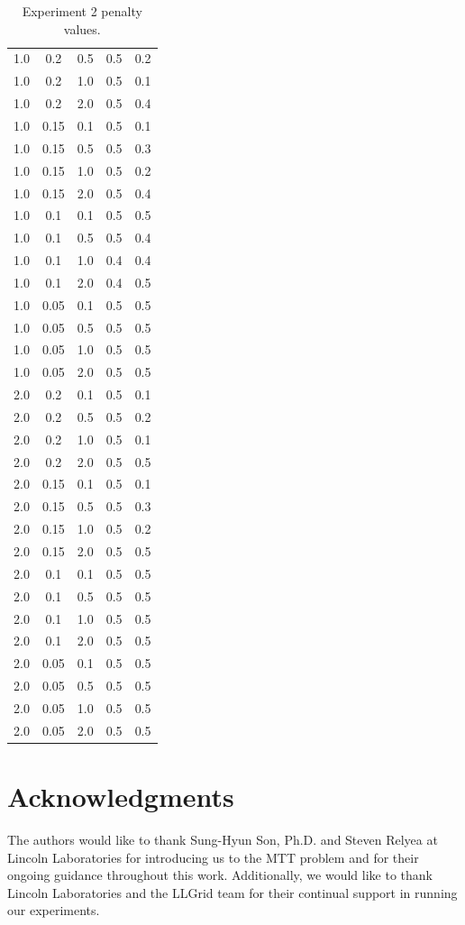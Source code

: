 \documentclass[journal]{IEEEtran}
\begin{document}
\begin{table}[ht]
\begin{tabular}{c|c|c|c|c}
1.0 & 0.2 & 0.5 & 0.5 & 0.2 \\
1.0 & 0.2 & 1.0 & 0.5 & 0.1 \\
1.0 & 0.2 & 2.0 & 0.5 & 0.4 \\
1.0 & 0.15 & 0.1 & 0.5 & 0.1 \\
1.0 & 0.15 & 0.5 & 0.5 & 0.3 \\
1.0 & 0.15 & 1.0 & 0.5 & 0.2 \\
1.0 & 0.15 & 2.0 & 0.5 & 0.4 \\
1.0 & 0.1 & 0.1 & 0.5 & 0.5 \\
1.0 & 0.1 & 0.5 & 0.5 & 0.4 \\
1.0 & 0.1 & 1.0 & 0.4 & 0.4 \\
1.0 & 0.1 & 2.0 & 0.4 & 0.5 \\
1.0 & 0.05 & 0.1 & 0.5 & 0.5 \\
1.0 & 0.05 & 0.5 & 0.5 & 0.5 \\
1.0 & 0.05 & 1.0 & 0.5 & 0.5 \\
1.0 & 0.05 & 2.0 & 0.5 & 0.5 \\
2.0 & 0.2 & 0.1 & 0.5 & 0.1 \\
2.0 & 0.2 & 0.5 & 0.5 & 0.2 \\
2.0 & 0.2 & 1.0 & 0.5 & 0.1 \\
2.0 & 0.2 & 2.0 & 0.5 & 0.5 \\
2.0 & 0.15 & 0.1 & 0.5 & 0.1 \\
2.0 & 0.15 & 0.5 & 0.5 & 0.3 \\
2.0 & 0.15 & 1.0 & 0.5 & 0.2 \\
2.0 & 0.15 & 2.0 & 0.5 & 0.5 \\
2.0 & 0.1 & 0.1 & 0.5 & 0.5 \\
2.0 & 0.1 & 0.5 & 0.5 & 0.5 \\
2.0 & 0.1 & 1.0 & 0.5 & 0.5 \\
2.0 & 0.1 & 2.0 & 0.5 & 0.5 \\
2.0 & 0.05 & 0.1 & 0.5 & 0.5 \\
2.0 & 0.05 & 0.5 & 0.5 & 0.5 \\
2.0 & 0.05 & 1.0 & 0.5 & 0.5 \\
2.0 & 0.05 & 2.0 & 0.5 & 0.5 \\
\hline
\end{tabular}
\caption{Experiment 2 penalty values.}
\label{tab:Penalties}
\end{table}

\section*{Acknowledgments}
The authors would like to thank Sung-Hyun Son, Ph.D. and Steven Relyea at Lincoln Laboratories for introducing us to the MTT problem and for their ongoing guidance throughout this work. Additionally, we would like to thank Lincoln Laboratories and the LLGrid team for their continual support in running our experiments. 
\end{document}
